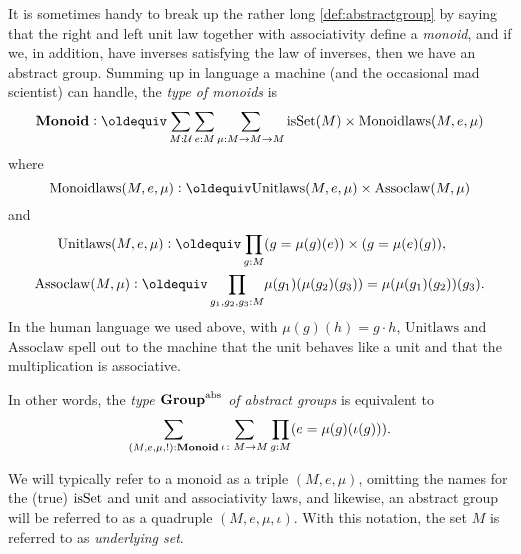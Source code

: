 \begin{remark}
  It is sometimes handy to break up the rather long
  \cref{def:abstractgroup} by saying that the right and left unit law
  together with associativity define a \emph{monoid}, and if we, in
  addition, have inverses satisfying the law of inverses, then we have
  an abstract group.%
  \label{rem:typemonoidabstrgp}
  Summing up in language a machine (and the occasional mad scientist)
  can handle, the \emph{type of monoids} is
  $$\typemonoid\defequi \sum_{M:\UU}\sum_{e:M}\sum_{\mu{}:M\to M\to M}
  \isset{(M)}\times\mathrm{Monoidlaws}(M,e,\mu)
  $$
  where
  $$\mathrm{Monoidlaws}(M,e,\mu)\defequi\mathrm{Unitlaws}(M,e,\mu)\times\mathrm{Assoclaw}(M,\mu{})$$
  and
  \begin{align*}
    \mathrm{Unitlaws}(M,e,\mu)\defequi\prod_{g:M}
    & (g=\mu{}(g)(e))\times(g=\mu{}(e)(g)),
    \\
    \mathrm{Assoclaw}(M,\mu{})\defequi\prod_{g_1,g_2,g_3:M}
    & \mu{}(g_1)(\mu{}(g_2)(g_3))=\mu{}(\mu{}(g_1)(g_2))(g_3).
  \end{align*}
  In the human language we used above, with $\mu(g)(h)=g\cdot h$,
  $\mathrm{Unitlaws}$ and $\mathrm{Assoclaw}$ spell out to the machine
  that the unit behaves like a unit and that the multiplication is
  associative.

  In other words, the \emph{type $\mathbf{Group}^{\mathrm{abs}}$ of abstract
    groups} is equivalent to
  \begin{displaymath}
    \sum_{(M,e,\mu,!):\mathbf{Monoid}} \sum_{\iota\colon M\to M} \prod_{g:M}(e=\mu(g)(\iota(g))).
  \end{displaymath}

  We will typically refer to a monoid as a triple $(M,e,\mu)$,
  omitting the names for the (true) $\mathrm{isSet}$ and unit and
  associativity laws, and likewise, an abstract group will be referred
  to as a quadruple $(M,e,\mu,\iota)$.  With this notation, the set
  $M$ is referred to as \emph{underlying set}.
\end{remark}

